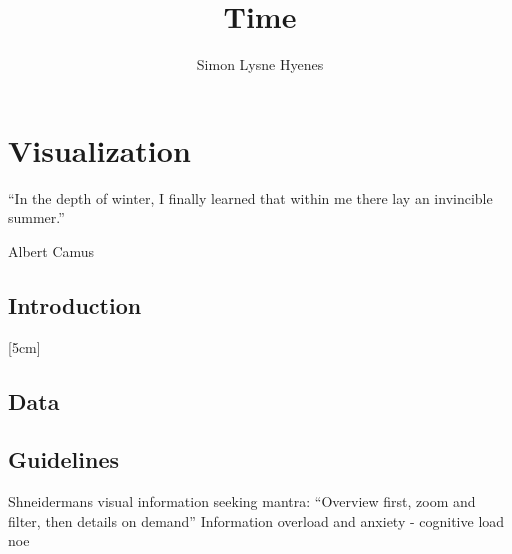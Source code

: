 \documentclass[11pt,UKenglish, a4paper]{article}
\author{Simon Lysne Hyenes}
\title{Time}
\begin{document}
\section{Visualization}

\epigraph{``In the depth of winter, I finally learned that within me there lay an invincible summer.''}
{Albert Camus}
\subsection{Introduction}


[5cm]

\subsection{Data}

\subsection{Guidelines}
Shneidermans visual information seeking mantra: 
``Overview first, zoom and filter, then details on demand''\cite[p.~2]{key}
Information overload and anxiety - cognitive load
noe\cite*{Friedman2008Data}
\end{document}
